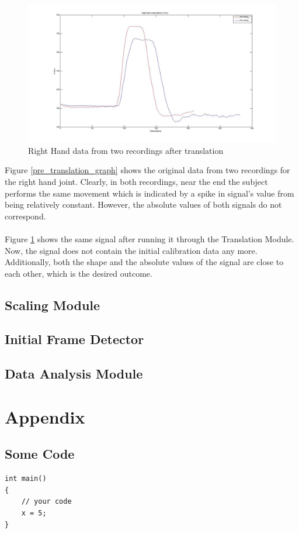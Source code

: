\documentclass[10pt]{article}
\begin{document}
\begin{figure}[h]
\centering
\includegraphics[scale=0.3]{R_H_Data_Relative_Torso.jpg}
\caption{Right Hand data from two recordings after translation}
\label{post_translation_graph}
\end{figure}

\noindent
Figure \ref{pre_translation_graph} shows the original data from two recordings for the right hand joint. Clearly, in both recordings, near the end the subject performs the same movement which is indicated by a spike in signal's value from being relatively constant. However, the absolute values of both signals do not correspond.
\\\\
\noindent
Figure \ref{post_translation_graph} shows the same signal after running it through the Translation Module. Now, the signal does not contain the initial calibration data any more. Additionally, both the shape and the absolute values of the signal are close to each other, which is the desired outcome.

\clearpage
\subsection{Scaling Module}
\subsection{Initial Frame Detector}
\subsection{Data Analysis Module}

\clearpage
\section*{Appendix}
\subsection*{Some Code}
\begin{lstlisting}
int main()
{
	// your code
	x = 5;
}

\end{lstlisting}
\end{document}
